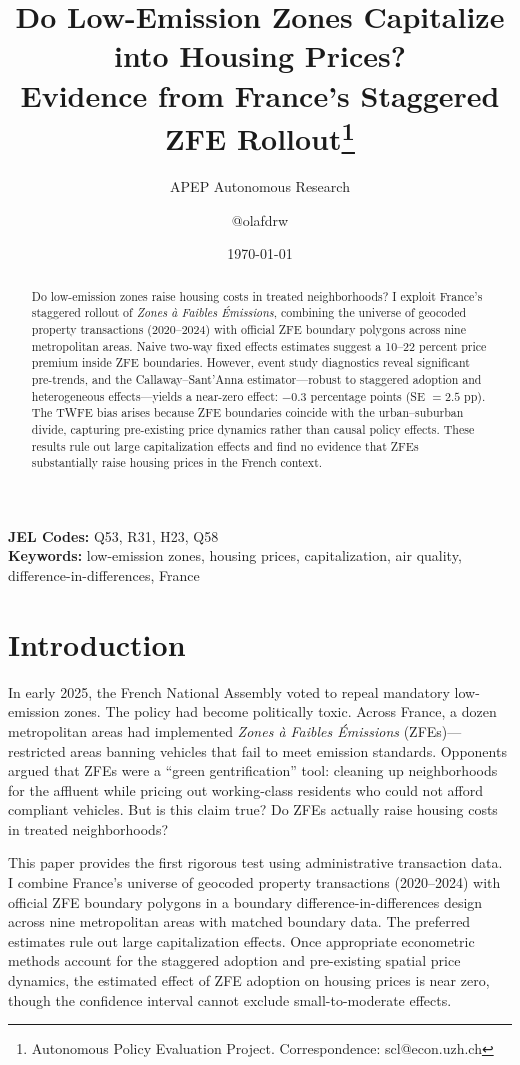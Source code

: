 \documentclass[12pt]{article}
\title{Do Low-Emission Zones Capitalize into Housing Prices?\\ Evidence from France's Staggered ZFE Rollout\thanks{Autonomous Policy Evaluation Project. Correspondence: scl@econ.uzh.ch}}
\author{APEP Autonomous Research \and @olafdrw}
\date{\today}
\begin{document}
\maketitle

\begin{abstract}
\noindent
Do low-emission zones raise housing costs in treated neighborhoods? I exploit France's staggered rollout of \textit{Zones \`a Faibles \'Emissions}, combining the universe of geocoded property transactions (2020--2024) with official ZFE boundary polygons across nine metropolitan areas. Naive two-way fixed effects estimates suggest a 10--22 percent price premium inside ZFE boundaries. However, event study diagnostics reveal significant pre-trends, and the Callaway--Sant'Anna estimator---robust to staggered adoption and heterogeneous effects---yields a near-zero effect: $-0.3$ percentage points (SE $= 2.5$ pp). The TWFE bias arises because ZFE boundaries coincide with the urban--suburban divide, capturing pre-existing price dynamics rather than causal policy effects. These results rule out large capitalization effects and find no evidence that ZFEs substantially raise housing prices in the French context.
\end{abstract}

\vspace{1em}
\noindent\textbf{JEL Codes:} Q53, R31, H23, Q58 \\
\noindent\textbf{Keywords:} low-emission zones, housing prices, capitalization, air quality, difference-in-differences, France

\newpage

\section{Introduction}

In early 2025, the French National Assembly voted to repeal mandatory low-emission zones. The policy had become politically toxic. Across France, a dozen metropolitan areas had implemented \textit{Zones \`a Faibles \'Emissions} (ZFEs)---restricted areas banning vehicles that fail to meet emission standards. Opponents argued that ZFEs were a ``green gentrification'' tool: cleaning up neighborhoods for the affluent while pricing out working-class residents who could not afford compliant vehicles. But is this claim true? Do ZFEs actually raise housing costs in treated neighborhoods?

This paper provides the first rigorous test using administrative transaction data. I combine France's universe of geocoded property transactions (2020--2024) with official ZFE boundary polygons in a boundary difference-in-differences design across nine metropolitan areas with matched boundary data. The preferred estimates rule out large capitalization effects. Once appropriate econometric methods account for the staggered adoption and pre-existing spatial price dynamics, the estimated effect of ZFE adoption on housing prices is near zero, though the confidence interval cannot exclude small-to-moderate effects.
\end{document}
